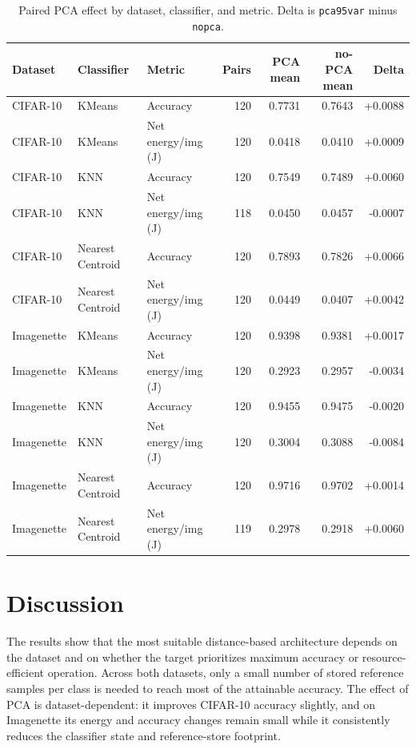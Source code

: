 \documentclass[sigconf,review]{acmart}
\begin{document}
\begin{table}[t]
  \caption{Paired PCA effect by dataset, classifier, and metric. Delta is \texttt{pca95var} minus \texttt{nopca}.}
  \label{tab:pca-effect}
  \centering
  \footnotesize
  \begin{tabular}{@{}lllrrrr@{}}
    \toprule
    Dataset & Classifier & Metric & Pairs & PCA mean & no-PCA mean & Delta \\
    \midrule
    CIFAR-10 & KMeans & Accuracy & 120 & 0.7731 & 0.7643 & +0.0088 \\
    CIFAR-10 & KMeans & Net energy/img (J) & 120 & 0.0418 & 0.0410 & +0.0009 \\
    CIFAR-10 & KNN & Accuracy & 120 & 0.7549 & 0.7489 & +0.0060 \\
    CIFAR-10 & KNN & Net energy/img (J) & 118 & 0.0450 & 0.0457 & -0.0007 \\
    CIFAR-10 & Nearest Centroid & Accuracy & 120 & 0.7893 & 0.7826 & +0.0066 \\
    CIFAR-10 & Nearest Centroid & Net energy/img (J) & 120 & 0.0449 & 0.0407 & +0.0042 \\
    Imagenette & KMeans & Accuracy & 120 & 0.9398 & 0.9381 & +0.0017 \\
    Imagenette & KMeans & Net energy/img (J) & 120 & 0.2923 & 0.2957 & -0.0034 \\
    Imagenette & KNN & Accuracy & 120 & 0.9455 & 0.9475 & -0.0020 \\
    Imagenette & KNN & Net energy/img (J) & 120 & 0.3004 & 0.3088 & -0.0084 \\
    Imagenette & Nearest Centroid & Accuracy & 120 & 0.9716 & 0.9702 & +0.0014 \\
    Imagenette & Nearest Centroid & Net energy/img (J) & 119 & 0.2978 & 0.2918 & +0.0060 \\
    \bottomrule
  \end{tabular}
\end{table}

\section{Discussion}
\label{sec:discussion}
The results show that the most suitable distance-based architecture depends on the dataset and on whether the target prioritizes maximum accuracy or resource-efficient operation.
Across both datasets, only a small number of stored reference samples per class is needed to reach most of the attainable accuracy.
The effect of PCA is dataset-dependent: it improves CIFAR-10 accuracy slightly, and on Imagenette its energy and accuracy changes remain small while it consistently reduces the classifier state and reference-store footprint.
\end{document}
